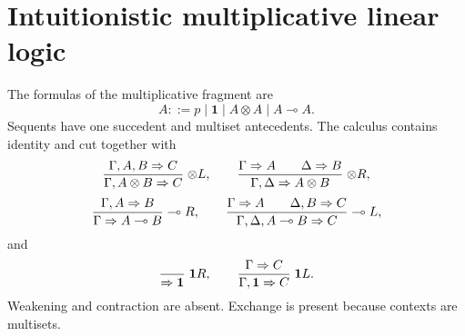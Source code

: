 \section{Intuitionistic multiplicative linear logic}
\label{sec:relevance-linear-03}

The formulas of the multiplicative fragment are
\[
  A::=p\mid\mathbf 1\mid A\otimes A\mid A\multimap A.
\]
Sequents have one succedent and multiset antecedents.  The calculus contains
identity and cut together with
\[
\frac{\Gamma,A,B\Rightarrow C}
     {\Gamma,A\otimes B\Rightarrow C}\;\textsc{\(\otimes L\)},
\qquad
\frac{\Gamma\Rightarrow A\qquad\Delta\Rightarrow B}
     {\Gamma,\Delta\Rightarrow A\otimes B}\;\textsc{\(\otimes R\)},
\]
\[
\frac{\Gamma,A\Rightarrow B}
     {\Gamma\Rightarrow A\multimap B}\;\textsc{\(\multimap R\)},
\qquad
\frac{\Gamma\Rightarrow A\qquad\Delta,B\Rightarrow C}
     {\Gamma,\Delta,A\multimap B\Rightarrow C}\;\textsc{\(\multimap L\)},
\]
and
\[
\frac{}{\Rightarrow\mathbf1}\;\textsc{\(\mathbf1R\)},
\qquad
\frac{\Gamma\Rightarrow C}
     {\Gamma,\mathbf1\Rightarrow C}\;\textsc{\(\mathbf1L\)}.
\]
Weakening and contraction are absent.  Exchange is present because contexts
are multisets.

